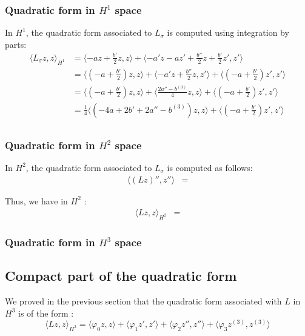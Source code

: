 \documentclass[11pt,a4paper]{article}
\begin{document}
\subsubsection{Quadratic form in $H^1$ space}
In $H^1$, the quadratic form associated to $L_\sigma$ is computed using integration by parts:
\begin{align*}
  \langle L_\sigma z, z \rangle_{H^1}   &=   \langle -az + \frac{b'}{2}z, z \rangle +  \langle -a'z-az' + \frac{b''}{2}z+ \frac{b'}{2}z', z' \rangle \\
  &=  \langle (-a + \frac{b'}{2})z, z \rangle +  \langle -a'z + \frac{b''}{2}z, z' \rangle +  \langle (-a + \frac{b'}{2})z', z' \rangle \\
  &=  \langle (-a + \frac{b'}{2})z, z \rangle +  \langle \frac{2a'' - b^{(3)}}{4} z, z \rangle +   \langle (-a + \frac{b'}{2})z', z' \rangle \\
  &= \frac{1}{4} \langle (-4a +2b' +2a'' - b^{(3)}) z, z \rangle +   \langle (-a + \frac{b'}{2})z', z' \rangle \\
\end{align*}


\subsubsection{Quadratic form in $H^2$ space}
In $H^2$, the quadratic form associated to $L_\sigma$  is computed as follows:
\begin{align*}
  \langle (Lz)'', z'' \rangle   &=   
\end{align*}

Thus, we have in $H^2$ :
\begin{align*}
  \langle Lz, z \rangle_{H^2}   &=  
\end{align*}



\subsubsection{Quadratic form in $H^3$ space}

\newpage 
\subsection{Compact part of the quadratic form}
We proved in the previous section that the quadratic form associated with $L$ in $H^3$ is of the form :
\[ \langle Lz, z \rangle_{H^3} =  \langle \varphi_0 z, z \rangle +\langle \varphi_1 z', z' \rangle +\langle \varphi_2 z'', z'' \rangle +\langle \varphi_3 z^{(3)}, z^{(3)} \rangle\]
\end{document}
